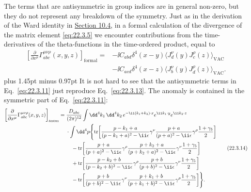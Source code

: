 The terms that are antisymmetric in group indices are in general non-zero,
but they do not represent any breakdown of the symmetry. Just as in the
derivation of the Ward identity in \hyperref[sec:10.4]{Section 10.4}, in a
formal calculation of the divergence of the matrix element
\eqref{eq:22.3.5} we encounter contributions from the time-derivatives of
the theta-functions in the time-ordered product, equal to
\begin{equation}
 \begin{aligned}
 \left[
  \frac{\partial}{\partial x^\mu}
  \Gamma_{abc}^{\mu\nu\rho}(x,y,z)
 \right]_{\mathrm{formal}}
 ={}&-\ii C_{abd}\delta^4(x-y)
 \bigl\langle J_d^\nu(y)J_c^\rho(z)\bigr\rangle_{\mathrm{VAC}}
 \\
 &-\ii C_{acd}\delta^4(x-z)
 \bigl\langle J_b^\nu(y)J_d^\rho(z)\bigr\rangle_{\mathrm{VAC}}.
 \end{aligned}
 \tag{22.3.13}\label{eq:22.3.13}
\end{equation}
{\spaceskip=2.90pt plus 1.45pt minus 0.97pt
It is not hard to see that the antisymmetric terms in
Eq.~\eqref{eq:22.3.11} just reproduce
Eq.~\eqref{eq:22.3.13}.}
The anomaly
is contained in the symmetric part of Eq.~\eqref{eq:22.3.11}:
\begin{equation}
 \begin{aligned}
 \left[
  \frac{\partial}{\partial x^\mu}
  \Gamma_{abc}^{\mu\nu\rho}(x,y,z)
 \right]_{\mathrm{anom}}
 ={}&\frac{D_{abc}}{(2\pi)^{12}}
 \int \dd^4k_1\,\dd^4k_2\,
 e^{-\ii(k_1+k_2)\cdot x}e^{\ii k_1\cdot y}e^{\ii k_2\cdot z}
 \\
 &\cdot\int \dd^4p\Biggl\{
 \operatorname{tr}\!\left[
  \frac{\sl{p}-\sl{k}_1+\sl{a}}{(p-k_1+a)^2-\ii\epsilon}\gamma^\nu
  \frac{\sl{p}+\sl{a}}{(p+a)^2-\ii\epsilon}\gamma^\rho
  \frac{1+\gamma_5}{2}
 \right]
 \\
 &\quad-\operatorname{tr}\!\left[
  \frac{\sl{p}+\sl{a}}{(p+a)^2-\ii\epsilon}\gamma^\rho
  \frac{\sl{p}+\sl{k}_2+\sl{a}}{(p+k_2+a)^2-\ii\epsilon}\gamma^\nu
  \frac{1+\gamma_5}{2}
 \right]
 \\
 &\quad+\operatorname{tr}\!\left[
  \frac{\sl{p}-\sl{k}_2+\sl{b}}{(p-k_2+b)^2-\ii\epsilon}\gamma^\rho
  \frac{\sl{p}+\sl{b}}{(p+b)^2-\ii\epsilon}\gamma^\nu
  \frac{1+\gamma_5}{2}
 \right]
 \\
 &\quad-\operatorname{tr}\!\left[
  \frac{\sl{p}+\sl{b}}{(p+b)^2-\ii\epsilon}\gamma^\nu
  \frac{\sl{p}+\sl{k}_1+\sl{b}}{(p+k_1+b)^2-\ii\epsilon}\gamma^\rho
  \frac{1+\gamma_5}{2}
 \right]
 \Biggr\}.
 \end{aligned}
 \tag{22.3.14}\label{eq:22.3.14}
\end{equation}
